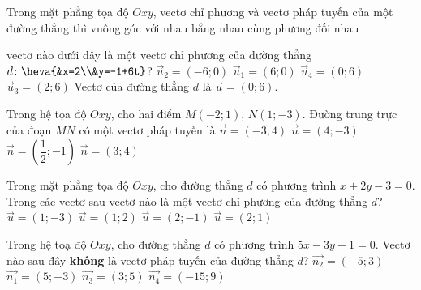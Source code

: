 \begin{ex}%
	Trong mặt phẳng tọa độ $Oxy$, vectơ chỉ phương và vectơ pháp tuyến của một đường thẳng thì
	\choice
	{\True vuông góc với nhau}
	{bằng nhau}
	{cùng phương}
	{đối nhau}
\end{ex}


\begin{ex}%
	vectơ nào dưới đây là một vectơ chỉ phương của đường thẳng $d\colon\heva{&x=2\\&y=-1+6t}$?
	\choice
	{$\overrightarrow{u}_2=(-6;0)$}
	{$\overrightarrow{u}_1=(6;0)$}
	{\True $\overrightarrow{u}_4=(0;6)$}
	{$\overrightarrow{u}_3=(2;6)$}
	\loigiai
	{
		Vectơ của đường thẳng $d$ là $\overrightarrow{u}=(0;6)$.
	}
\end{ex}


\begin{ex}%
	Trong hệ tọa độ $Oxy$, cho hai điểm $M(-2;1)$, $N(1;-3)$. Đường trung trực của đoạn $MN$ có một vectơ pháp tuyến là
	\choice
	{\True $\overrightarrow{n}=(-3;4)$}
	{$\overrightarrow{n}=(4;-3)$}
	{$\overrightarrow{n}=\left(\dfrac{1}{2};-1\right)$}
	{$\overrightarrow{n}=(3;4)$}
\end{ex}


\begin{ex}%
	Trong mặt phẳng tọa độ $Oxy$, cho đường thẳng $d$ có phương trình $x+2y-3=0$. Trong các vectơ sau vectơ nào là một vectơ chỉ phương của đường thẳng $d$?
	\choice
	{$\overrightarrow{u}=(1;-3)$}
	{$\overrightarrow{u}=(1;2)$}
	{\True $\overrightarrow{u}=(2;-1)$}
	{$\overrightarrow{u}=(2;1)$}
\end{ex}


\begin{ex}%
	Trong hệ toạ độ $Oxy$, cho đường thẳng $d$ có phương trình $5x-3y+1=0$. Vectơ nào sau đây \textbf{không} là vectơ pháp tuyến của đường thẳng $d$?
	\choice
	{$\overrightarrow{n_2}=(-5;3)$}
	{$\overrightarrow{n_1}=(5;-3)$}
	{\True $\overrightarrow{n_3}=(3;5)$}
	{$\overrightarrow{n_4}=(-15;9)$}
\end{ex}


